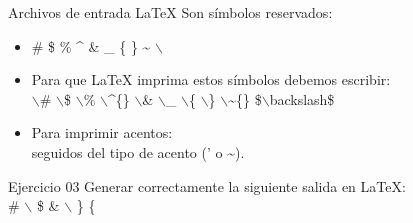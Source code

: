 \begin{frame}{Archivos de entrada \LaTeX{}}
    Son s\'imbolos reservados:
    \begin{itemize}
        \item \# \hspace*{1em} \$ \hspace*{1em} \% \hspace*{1em} \^{} \hspace*{1em} \& \hspace*{1em} \_ \hspace*{1em} \{ \hspace*{1em} \} \hspace*{1em} \~{} \hspace*{1em} $\backslash$
        \item Para que \LaTeX{} imprima estos s\'imbolos debemos escribir: \\
            $\backslash$\# \hspace*{.7em} $\backslash$\$ \hspace*{.7em} $\backslash$\% \hspace*{.7em} $\backslash$\^{}\{\} \hspace*{.7em} $\backslash$\& \hspace*{.7em} $\backslash$\_ \hspace*{.7em} $\backslash$\{ \hspace*{.7em} $\backslash$\} \hspace*{.7em} $\backslash$\~{}\{\} \hspace*{.7em} \$$\backslash$backslash\$
        \item Para imprimir acentos: \\ seguidos del tipo de acento (' o \textasciitilde). 
    \end{itemize}
    \begin{exampleblock}{Ejercicio 03}
    Generar correctamente la siguiente salida en \LaTeX{}: \\ \# $\backslash$ \$ \& $\backslash$ 	\} \{
    \end{exampleblock}
\end{frame}

